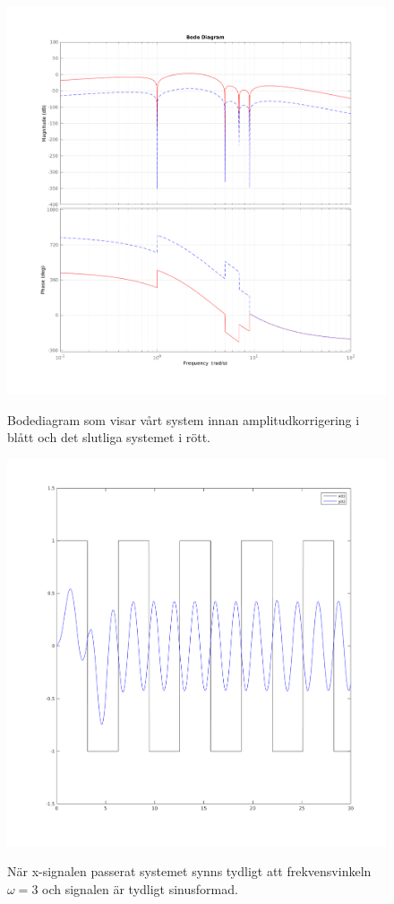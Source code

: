 \begin{figure}
    \caption{Bodediagram som visar vårt system innan amplitudkorrigering i
    blått och det slutliga systemet i rött.}
    \centering
    \includegraphics[scale=0.55]{figures/task4d-bode.png}
    \label{fig:task4d-bode}
\end{figure}

\clearpage

\begin{figure}
    \caption{När x-signalen passerat systemet synns tydligt att frekvensvinkeln
    $\omega = 3$ och signalen är tydligt sinusformad.}
    \centering
    \includegraphics[scale=0.55]{figures/task4e-xsignal-sys2.png}
    \label{fig:task4e-xsignal-sys2}
\end{figure}

